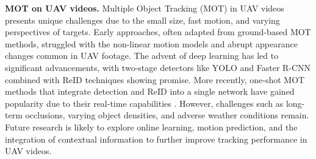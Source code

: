\textbf{MOT on UAV videos.} 
Multiple Object Tracking (MOT) in UAV videos presents unique challenges due to the small size, fast motion, and varying perspectives of targets. Early approaches, often adapted from ground-based MOT methods, struggled with the non-linear motion models and abrupt appearance changes common in UAV footage. The advent of deep learning has led to significant advancements, with two-stage detectors like YOLO \cite{redmonYouOnlyLook2016} and Faster R-CNN \cite{shouxinrenFasterRCNNRealtime2015} combined with ReID techniques \cite{3} showing promise. More recently, one-shot MOT methods that integrate detection and ReID into a single network have gained popularity due to their real-time capabilities \cite{liuUAVMOT2022}. However, challenges such as long-term occlusions, varying object densities, and adverse weather conditions remain. Future research is likely to explore online learning, motion prediction, and the integration of contextual information to further improve tracking performance in UAV videos.